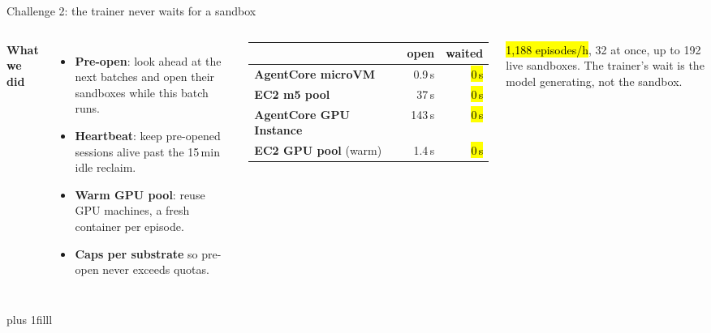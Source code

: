 \begin{frame}{Challenge 2: the trainer never waits for a sandbox}
\begin{columns}[T]
{\normalsize\textbf{What we did}}
\begin{itemize}\small\setlength{\itemsep}{1.2mm}
\item \textbf{Pre-open}: look ahead at the next batches and open their sandboxes while this batch runs.
\item \textbf{Heartbeat}: keep pre-opened sessions alive past the 15\,min idle reclaim.
\item \textbf{Warm GPU pool}: reuse GPU machines, a fresh container per episode.
\item \textbf{Caps per substrate} so pre-open never exceeds quotas.
\end{itemize}
\small\setlength{\tabcolsep}{4pt}\renewcommand{\arraystretch}{1.3}
\begin{tabularx}{\linewidth}{@{}Y r r@{}}
\toprule
& \textbf{open} & \textbf{waited}\\
\midrule
\textcolor{cat2}{\textbf{AgentCore microVM}} & 0.9\,s & \hl{0\,s}\\
\textcolor{cat1}{\textbf{EC2 m5 pool}} & 37\,s & \hl{0\,s}\\
\textcolor{cat3}{\textbf{AgentCore GPU Instance}} & 143\,s & \hl{0\,s}\\
\textcolor{cat1}{\textbf{EC2 GPU pool}} (warm) & 1.4\,s & \hl{0\,s}\\
\bottomrule
\end{tabularx}
\par\vspace{2mm}
{\footnotesize\hl{1{,}188 episodes/h}, 32 at once, up to 192 live sandboxes. The trainer's wait is the model generating, not the sandbox.\par}
\end{columns}
\par\vskip 0pt plus 1filll
\end{frame}

